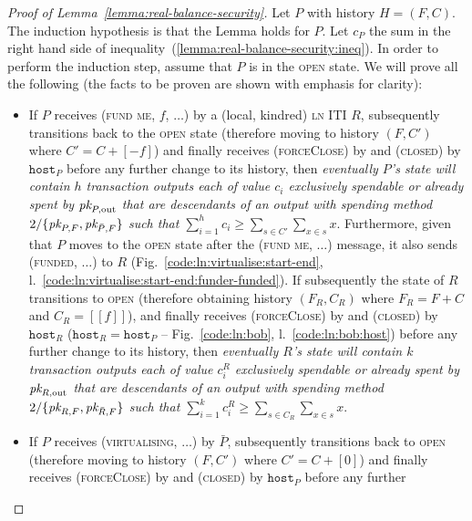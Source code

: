 \begin{proof}[Proof of Lemma~\ref{lemma:real-balance-security}]
  Let $P$ with history $H = (F, C)$. The induction hypothesis is that the Lemma
  holds for $P$. Let $c_P$ the sum in the right hand side of
  inequality~(\ref{lemma:real-balance-security:ineq}). In order to perform the
  induction step, assume that $P$ is in the \textsc{open} state. We will prove
  all the following (the facts to be proven are shown with emphasis for
  clarity):
  \begin{itemize}
    \item If $P$ receives (\textsc{fund me}, $f$, $\dots$) by a (local, kindred)
    \textsc{ln} ITI $R$, subsequently transitions back to the \textsc{open}
    state (therefore moving to history $(F, C')$ where $C' = C + [-f]$) and
    finally receives (\textsc{forceClose}) by \environment and (\textsc{closed}) by
    $\texttt{host}_P$ before any further change to its history, then
    \emph{eventually $P$'s \ledger state will contain $h$ transaction outputs
    each of value $c_i$ exclusively spendable or already spent by $\textit{pk}_{P,
    \mathrm{out}}$ that are descendants of an output with spending method
    $2/\{\textit{pk}_{P, F}, \textit{pk}_{\bar{P}, F}\}$ such that $\sum\limits_{i=1}^h c_i \geq
    \sum\limits_{s \in C'} \sum\limits_{x \in s} x$}. Furthermore, given that
    $P$ moves to the \textsc{open} state after the (\textsc{fund me}, $\dots$)
    message, it also sends (\textsc{funded}, $\dots$) to $R$
    (Fig.~\ref{code:ln:virtualise:start-end},
    l.~\ref{code:ln:virtualise:start-end:funder-funded}). If subsequently the
    state of $R$ transitions to \textsc{open} (therefore obtaining history
    $(F_R, C_R)$ where $F_R = F + C$ and $C_R = [[f]]$), and finally receives
    (\textsc{forceClose}) by \environment and (\textsc{closed}) by $\texttt{host}_R$
    ($\texttt{host}_R = \texttt{host}_P$ -- Fig.~\ref{code:ln:bob},
    l.~\ref{code:ln:bob:host}) before any further change to its history, then
    \emph{eventually $R$'s \ledger state will contain $k$ transaction outputs
    each of value $c^R_i$ exclusively spendable or already spent by $\textit{pk}_{R,
    \mathrm{out}}$ that are descendants of an output with spending method
    $2/\{\textit{pk}_{R, F}, \textit{pk}_{\bar{R}, F}\}$ such that $\sum\limits_{i=1}^k c^R_i \geq
    \sum\limits_{s \in C_R} \sum\limits_{x \in s} x$}.
    \item If $P$ receives (\textsc{virtualising}, $\dots$) by $\bar{P}$,
    subsequently transitions back to \textsc{open} (therefore moving to history
    $(F, C')$ where $C' = C + [0]$) and finally receives (\textsc{forceClose}) by
    \environment and (\textsc{closed}) by $\texttt{host}_P$ before any further

\end{itemize}
\end{proof}
